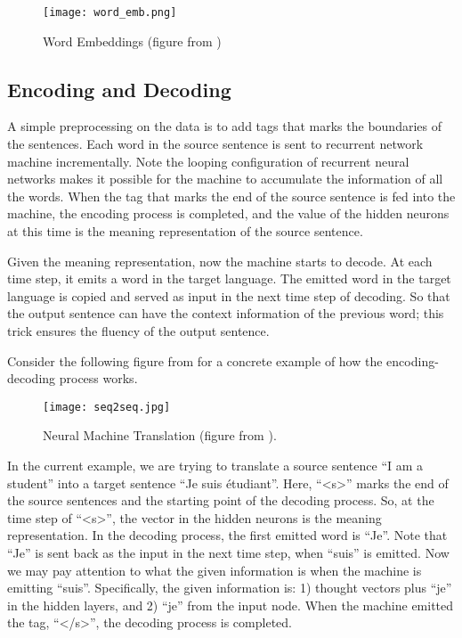 \begin{figure}
\caption{Word Embeddings (figure from \citet{roweis2000nonlinear})}
\centering
\texttt{[image: word\_emb.png]}
\end{figure} 


\subsection{Encoding and Decoding}

A simple preprocessing on the data is to add tags that marks the boundaries of the sentences. Each word in the source sentence is sent to recurrent network machine incrementally. 
Note the looping configuration of recurrent neural networks makes it possible for the machine to accumulate the information of all the words. When the tag that marks the end of the source sentence is fed into the machine, the encoding process is completed, and the value of the hidden neurons at this time is the meaning representation of the source sentence.  

Given the meaning representation, now the machine starts to decode. At each time step, it emits a word in the target language. The emitted word in the target language is copied and served as input in the next time step of decoding. So that the output sentence can have the context information of the previous word; this trick ensures the fluency of the output sentence. 

Consider the following figure from \citet{luong17GitHub} for a concrete example of how the encoding-decoding process works.  

\begin{figure}[h]
\caption{Neural Machine Translation (figure from \citet{luong17GitHub}).}
\centering
\texttt{[image: seq2seq.jpg]}
\end{figure} 

In the current example, we are trying to translate a source sentence ``I am a student'' into a target sentence ``Je suis \'{e}tudiant''. Here, ``<s>'' marks the end of the source sentences and the starting point of the decoding process. 
So, at the time step of  ``<s>'', the vector in the hidden neurons is the meaning representation. In the decoding process, the first emitted word is ``Je''. Note that ``Je'' is sent back as the input in the next time step, when ``suis'' is emitted. Now we may pay attention to what the given information is when the machine is emitting ``suis''. Specifically, the given information is: 1) thought vectors plus ``je'' in the hidden layers, and 2) ``je'' from the input node. When the machine emitted the tag, ``</s>'', the decoding process is completed. 

